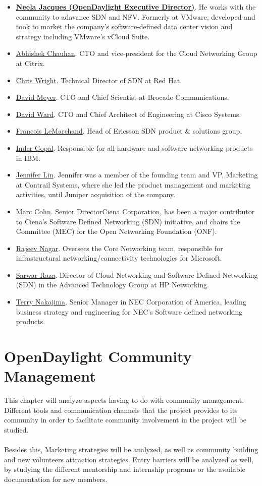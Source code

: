 \documentclass[a4paper, 12pt]{book}
\begin{document}
\begin{itemize}\itemsep0pt
\item{\underline{\textbf{Neela Jacques (OpenDaylight Executive Director)}}}. He works with the community to adavance SDN and NFV. Formerly at VMware, developed and took to market the company’s software-defined data center vision and strategy including VMware’s vCloud Suite.
\item{\underline{Abhishek Chauhan}}. CTO and vice-president for the Cloud Networking Group at Citrix.
\item{\underline{Chris Wright}}. Technical Director of SDN at Red Hat.
\item{\underline{David Meyer}}. CTO and Chief Scientist at Brocade Communications.
\item{\underline{David Ward}}. CTO and Chief Architect of Engineering at Cisco Systems.
\item{\underline{Francois LeMarchand}}. Head of Ericsson SDN product \& solutions group.
\item{\underline{Inder Gopal}}. Responsible for all hardware and software networking products in IBM.
\item{\underline{Jennifer Lin}}. Jennifer was a member of the founding team and VP, Marketing at Contrail Systems, where she led the product management and marketing activities, until Juniper acquisition of the company.
\item{\underline{Marc Cohn}}. Senior DirectorCiena Corporation, has been a major contributor to Ciena’s Software Defined Networking (SDN) initiative, and chairs the Committee (MEC) for the Open Networking Foundation (ONF).
\item{\underline{Rajeev Nagar}}. Oversees the Core Networking team, responsible for infrastructural networking/connectivity technologies for Microsoft.
\item{\underline{Sarwar Raza}}. Director of Cloud Networking and Software Defined Networking (SDN) in the Advanced Technology Group at HP Networking.
\item{\underline{Terry Nakajima}}. Senior Manager in NEC Corporation of America, leading business strategy and engineering for NEC’s Software defined networking products.
\end{itemize}

\section{OpenDaylight Community Management}
\label{chap:odlcommunitymgmt}
This chapter will analyze aspects having to do with community management. Different tools and communication channels that the project provides to its community in order to facilitate community involvement in the project will be studied.\\
\\
Besides this, Marketing strategies will be analyzed, as well as community building and new volunteers attraction strategies. Entry barriers will be analyzed as well, by studying the different mentorship and internship programs or the available documentation for new members.
\end{document}
